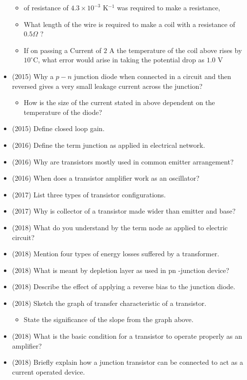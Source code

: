 \documentclass{article}
\begin{document}
\begin{itemize}
\begin{itemize}
\item of resistance of $ 4.3\times10^{-3}$ K$ ^{-1}$ was required to make a resistance,
\item  What length of the wire is required to make a coil with a resistance of $ 0.5\Omega $ ?
\item If on passing a Current of $ 2$ A the temperature of the coil above rises  by $ 10^{\circ}$C, what error would arise in taking the potential drop as $ 1.0$ V 
\end{itemize}
\item (2015)  Why a $ p-n$ junction diode when connected in a circuit and then reversed gives a very small leakage current across the junction? \begin{itemize}
\item How is the size of the current stated in above dependent on the temperature of the diode?
\end{itemize}
\item (2015)  Define closed loop gain. 
\item (2016)  Define the term junction as applied in electrical network.
\item (2016)  Why are transistors mostly used in common emitter arrangement?
\item (2016)  When does a transistor amplifier work as an oscillator?
\item (2017)  List three types of transistor configurations.
\item (2017)  Why is collector of a transistor made wider than emitter and base? 
\item (2018)  What do you understand by the term node as applied to electric circuit?
\item (2018)  Mention four types of energy losses suffered by a transformer.  
\item (2018)  What is meant by depletion layer as used in pn -junction device? 
\item (2018)  Describe the effect of applying a reverse bias to the junction diode. 
\item (2018)  Sketch the graph of transfer characteristic of a transistor. \begin{itemize}
\item State the significance of the slope from the graph above.
\end{itemize}
\item (2018)  What is the basic condition for a transistor to operate properly as an amplifier? 
\item (2018)  Briefly explain how a junction transistor can be connected to act as a current operated device. 

\end{itemize}
\end{document}
